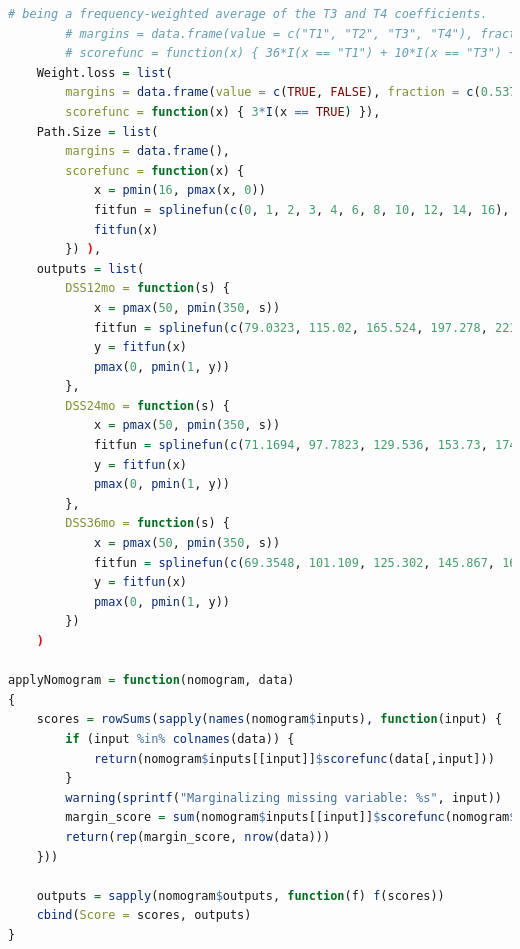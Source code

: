 \begin{lstlisting}[language=R]
		# being a frequency-weighted average of the T3 and T4 coefficients.
		# margins = data.frame(value = c("T1", "T2", "T3", "T4"), fraction = c(0.037, 0.119, 0.828, 1-0.037-0.119-0.828)),
		# scorefunc = function(x) { 36*I(x == "T1") + 10*I(x == "T3") + 63*I(x == "T4") }),
	Weight.loss = list(
		margins = data.frame(value = c(TRUE, FALSE), fraction = c(0.537, 1-0.537)),
		scorefunc = function(x) { 3*I(x == TRUE) }),
	Path.Size = list(
		margins = data.frame(),
		scorefunc = function(x) {
			x = pmin(16, pmax(x, 0))
			fitfun = splinefun(c(0, 1, 2, 3, 4, 6, 8, 10, 12, 14, 16), c(0, 29.74, 59.48, 86.70, 100, 97.29, 90.03, 82.77, 75.51, 68.25, 61.10), method = "natural")
			fitfun(x)
		}) ),
	outputs = list(
		DSS12mo = function(s) {
			x = pmax(50, pmin(350, s))
			fitfun = splinefun(c(79.0323, 115.02, 165.524, 197.278, 221.774, 242.339, 261.089, 279.839, 299.194, 323.992, 337.298), c(0.94, 0.9, 0.8, 0.7, 0.6, 0.5, 0.4, 0.3, 0.2, 0.1, 0.06))
			y = fitfun(x)
			pmax(0, pmin(1, y))
		},
		DSS24mo = function(s) {
			x = pmax(50, pmin(350, s))
			fitfun = splinefun(c(71.1694, 97.7823, 129.536, 153.73, 174.294, 193.347, 211.794, 231.452, 255.645, 303.125), c(0.86, 0.8, 0.7, 0.6, 0.5, 0.4, 0.3, 0.2, 0.1, 0.01))
			y = fitfun(x)
			pmax(0, pmin(1, y))
		},
		DSS36mo = function(s) {
			x = pmax(50, pmin(350, s))
			fitfun = splinefun(c(69.3548, 101.109, 125.302, 145.867, 164.919, 183.367, 202.722, 226.915, 274.093), c(0.8, 0.7, 0.6, 0.5, 0.4, 0.3, 0.2, 0.1, 0.01))
			y = fitfun(x)
			pmax(0, pmin(1, y))
		}) 
	)

applyNomogram = function(nomogram, data)
{
	scores = rowSums(sapply(names(nomogram$inputs), function(input) {
		if (input %in% colnames(data)) {
			return(nomogram$inputs[[input]]$scorefunc(data[,input]))
		}
		warning(sprintf("Marginalizing missing variable: %s", input))
		margin_score = sum(nomogram$inputs[[input]]$scorefunc(nomogram$inputs[[input]]$margins$value) * nomogram$inputs[[input]]$margins$fraction)
		return(rep(margin_score, nrow(data)))
	}))

	outputs = sapply(nomogram$outputs, function(f) f(scores))
	cbind(Score = scores, outputs)
}
\end{lstlisting}
